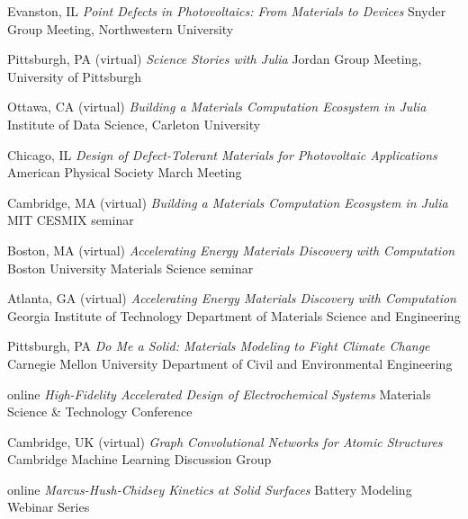         {Evanston, IL}
        {\textit{Point Defects in Photovoltaics: From Materials to Devices}}
        {Snyder Group Meeting, Northwestern University}

	{Pittsburgh, PA (virtual)}
	{\textit{Science Stories with Julia}}
    {Jordan Group Meeting, University of Pittsburgh}

\vspace{-2mm}
\datedsubsection{}
	{Ottawa, CA (virtual)}
	{\textit{Building a Materials Computation Ecosystem in Julia}}
    {Institute of Data Science, Carleton University}

\vspace{-2mm}
\datedsubsection{}
    {Chicago, IL}
    {\textit{Design of Defect-Tolerant Materials for Photovoltaic Applications}}
    {American Physical Society March Meeting}

\vspace{-2mm}
\datedsubsection{}
    {Cambridge, MA (virtual)}
    {\textit{Building a Materials Computation Ecosystem in Julia}}
    {MIT CESMIX seminar}

\vspace{-2mm}
\datedsubsection{}
    {Boston, MA (virtual)}
    {\textit{Accelerating Energy Materials Discovery with Computation}}
    {Boston University Materials Science seminar}

\vspace{-2mm}
    {Atlanta, GA (virtual)}
    {\textit{Accelerating Energy Materials Discovery with Computation}}
    {Georgia Institute of Technology Department of Materials Science and Engineering}

\vspace{-2mm}
\datedsubsection{}
    {Pittsburgh, PA}
    {\textit{Do Me a Solid: Materials Modeling to Fight Climate Change}}
    {Carnegie Mellon University Department of Civil and Environmental Engineering}

\vspace{-2mm}
    {online}
    {\textit{High-Fidelity Accelerated Design of Electrochemical Systems}}
    {Materials Science \& Technology Conference}

\vspace{-2mm}
\datedsubsection{}
    {Cambridge, UK (virtual)}
    {\textit{Graph Convolutional Networks for Atomic Structures}}
    {Cambridge Machine Learning Discussion Group}

\vspace{-2mm}
\datedsubsection{}
    {online}
    {\textit{Marcus-Hush-Chidsey Kinetics at Solid Surfaces}}
    {Battery Modeling Webinar Series}

